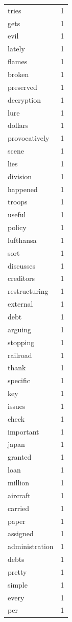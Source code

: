 \begin{tabular}{lr}
tries & 1 \\
gets & 1 \\
evil & 1 \\
lately & 1 \\
flames & 1 \\
broken & 1 \\
preserved & 1 \\
decryption & 1 \\
lure & 1 \\
dollars & 1 \\
provocatively & 1 \\
scene & 1 \\
lies & 1 \\
division & 1 \\
happened & 1 \\
troops & 1 \\
useful & 1 \\
policy & 1 \\
lufthansa & 1 \\
sort & 1 \\
discusses & 1 \\
creditors & 1 \\
restructuring & 1 \\
external & 1 \\
debt & 1 \\
arguing & 1 \\
stopping & 1 \\
railroad & 1 \\
thank & 1 \\
specific & 1 \\
key & 1 \\
issues & 1 \\
check & 1 \\
important & 1 \\
japan & 1 \\
granted & 1 \\
loan & 1 \\
million & 1 \\
aircraft & 1 \\
carried & 1 \\
paper & 1 \\
assigned & 1 \\
administration & 1 \\
debts & 1 \\
pretty & 1 \\
simple & 1 \\
every & 1 \\
per & 1 \\

\end{tabular}
